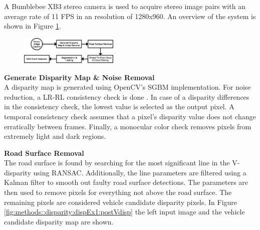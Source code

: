 \begin{multicols}{2}   

A Bumblebee XB3 stereo camera is used to acquire stereo image pairs with an average rate of 11 FPS in an resolution of 1280x960. An overview of the system is shown in Figure \ref{systemOverview::systemOverview}.

\begin{figure}[H]
  \centering
  \includegraphics[width=0.42\textwidth]{text/figures/systemForeslag4.png}
  \label{systemOverview::systemOverview}
\end{figure}


\textbf{Generate Disparity Map \& Noise Removal}\\
A disparity map is generated using OpenCV's SGBM implementation. For noise reduction, a LR-RL consistency check is done \cite{HirschmullerRLandSGBM}. In case of a disparity differences in the consistency check, the lowest value is selected as the output pixel. A temporal consistency check assumes that a pixel's disparity value does not change erratically between frames. Finally, a monocular color check removes pixels from extremely light and dark regions.

\textbf{Road Surface Removal}\\
The road surface is found by searching for the most significant line in the V-disparity using RANSAC. Additionally, the line parameters are filtered using a Kalman filter to smooth out faulty road surface detections. The parameters are then used to remove pixels for everything not above the road surface. The remaining pixels are considered vehicle candidate disparity pixels. In Figure \ref{fig:methods::disparity:dispEx1:postVdisp} the left input image and the vehicle candidate disparity map are shown.


\end{multicols}
